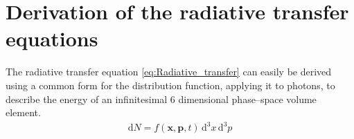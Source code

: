 
\chapter{Derivation of the radiative transfer equations} %

\label{AppendixB} %

The radiative transfer equation \eqref{eq:Radiative_transfer} can easily be derived using a common form for the distribution function, applying it to photons, to describe the energy of an infinitesimal 6 dimensional phase--space volume element.
\begin{align*}
 \mathrm{d}N = f(\textbf{x}, \textbf{p}, t)\,\mathrm{d}^{3}x\,\mathrm{d}^{3}p
\end{align*}

